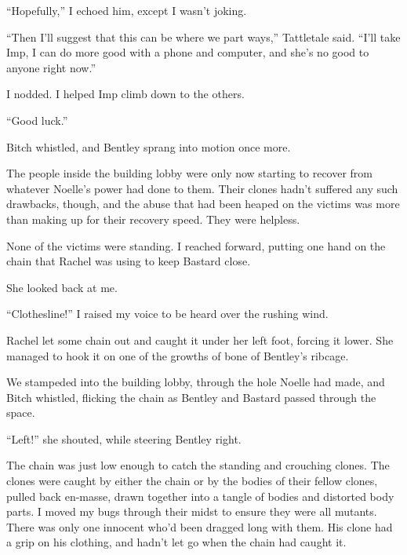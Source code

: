 ``Hopefully,'' I echoed him, except I wasn't joking.



``Then I'll suggest that this can be where we part ways,'' Tattletale said.  ``I'll take Imp, I can do more good with a phone and computer, and she's no good to anyone right now.''



I nodded.  I helped Imp climb down to the others.



``Good luck.''



Bitch whistled, and Bentley sprang into motion once more.



The people inside the building lobby were only now starting to recover from whatever Noelle's power had done to them.  Their clones hadn't suffered any such drawbacks, though, and the abuse that had been heaped on the victims was more than making up for their recovery speed.  They were helpless.



None of the victims were standing.  I reached forward, putting one hand on the chain that Rachel was using to keep Bastard close.



She looked back at me.



``Clothesline!'' I raised my voice to be heard over the rushing wind.



Rachel let some chain out and caught it under her left foot, forcing it lower.  She managed to hook it on one of the growths of bone of Bentley's ribcage.



We stampeded into the building lobby, through the hole Noelle had made, and Bitch whistled, flicking the chain as Bentley and Bastard passed through the space.



``Left!'' she shouted, while steering Bentley right.



The chain was just low enough to catch the standing and crouching clones.  The clones were caught by either the chain or by the bodies of their fellow clones, pulled back en-masse, drawn together into a tangle of bodies and distorted body parts.  I moved my bugs through their midst to ensure they were all mutants.  There was only one innocent who'd been dragged long with them.  His clone had a grip on his clothing, and hadn't let go when the chain had caught it.



